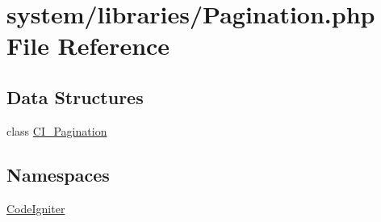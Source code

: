 \hypertarget{_pagination_8php}{}\section{system/libraries/\+Pagination.php File Reference}
\label{_pagination_8php}
\subsection*{Data Structures}
\begin{DoxyCompactItemize}
\item 
class \mbox{\hyperlink{class_c_i___pagination}{C\+I\+\_\+\+Pagination}}
\end{DoxyCompactItemize}
\subsection*{Namespaces}
\begin{DoxyCompactItemize}
\item 
 \mbox{\hyperlink{namespace_code_igniter}{Code\+Igniter}}
\end{DoxyCompactItemize}
